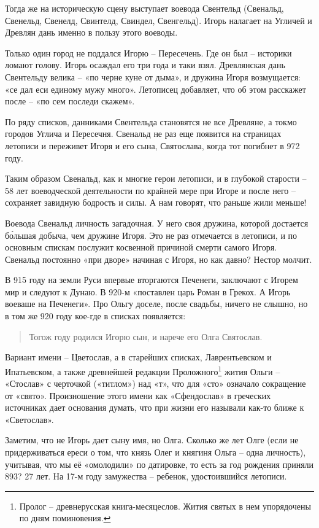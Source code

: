 Тогда же на историческую сцену выступает воевода Свентельд (Свенальд, Свенельд, Свенелд, Свинтелд, Свиндел, Свенгельд). Игорь налагает на Угличей и Древлян дань именно в пользу этого воеводы. 

Только один город не поддался Игорю – Пересечень. Где он был – историки ломают голову. Игорь осаждал его три года и таки взял. Древлянская дань Свентельду велика – «по черне куне от дыма», и дружина Игоря возмущается: «се дал еси единому мужу много». Летописец добавляет, что об этом расскажет после – «по сем последи скажем». 

По ряду списков, данниками Свентельда становятся не все Древляне, а токмо городов Углича и Пересечня. Свенальд не раз еще появится на страницах летописи и переживет Игоря и его сына, Святослава, когда тот погибнет в 972 году.

Таким образом Свенальд, как и многие герои летописи, и в глубокой старости – 58 лет воеводческой деятельности по крайней мере при Игоре и после него – сохраняет завидную бодрость и силы. А нам говорят, что раньше жили меньше!

Воевода Свенальд личность загадочная. У него своя дружина, которой достается б\'ольшая добыча, чем дружине Игоря. Это не раз отмечается в летописи, и по основным спискам послужит косвенной причиной смерти самого Игоря. Свенальд постоянно «при дворе» начиная с Игоря, но как давно? Нестор молчит.

В 915 году на земли Руси впервые вторгаются Печенеги, заключают с Игорем мир и следуют к Дунаю. В 920-м «поставлен царь Роман в Грекох. А Игорь воеваше на Печенеги». Про Ольгу доселе, после свадьбы, ничего не слышно, но в том же 920 году кое-где в списках появляется:

\begin{quotation}
Тогож году родился Игорю сын, и нарече его Олга Святослав.
\end{quotation}

Вариант имени – Цветослав, а в старейших списках, Лаврентьевском и Ипатьевском, а также древнейшей редакции Проложного\footnote{Пролог – древнерусская книга-месяцеслов. Жития святых в нем упорядочены по дням поминовения.} жития Ольги – «Стослав» с черточкой («титлом») над «т», что для «сто» означало сокращение от «свято». Произношение этого имени как «Сфендослав» в греческих источниках дает основания думать, что при жизни его называли как-то ближе к «Светослав».

Заметим, что не Игорь дает сыну имя, но Олга. Сколько же лет Олге (если не придерживаться ереси о том, что князь Олег и княгиня Ольга – одна личность), учитывая, что мы её «омолодили» по датировке, то есть за год рождения приняли 893? 27 лет. На 17-м году замужества – ребенок, удостоившийся летописи. 

